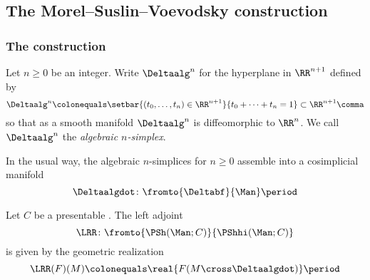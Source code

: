 
\subsection{The Morel--Suslin--Voevodsky construction}\label{sec:MVSconstruction}


\subsubsection{The construction}

\begin{notation}
	Let $ n \geq 0 $ be an integer.
	Write $ \Deltaalg^n $ for the hyperplane in $ \RR^{n+1} $ defined by
	\begin{equation*}
		\Deltaalg^n \colonequals \setbar{(t_0,\ldots,t_{n}) \in \RR^{n+1}}{t_0 + \cdots + t_{n} = 1} \subset \RR^{n+1} \comma
	\end{equation*}
	so that as a smooth manifold $ \Deltaalg^n $ is diffeomorphic to $ \RR^{n} $.
	We call $ \Deltaalg^n $ the \textit{algebraic $ n $-simplex}.

	In the usual way, the algebraic $ n $-simplices for $ n \geq 0 $ assemble into a cosimplicial manifold
	\begin{equation*}
		\Deltaalgdot \colon \fromto{\Deltabf}{\Man} \period
	\end{equation*}
\end{notation}

\begin{proposition}\label{prop:MorelVoevodsky}
	Let $ C $ be a presentable \category. 
	The left adjoint
	\begin{equation*}
		\LRR \colon \fromto{\PSh(\Man;C)}{\PShhi(\Man;C)}
	\end{equation*}
	is given by the geometric realization
	\begin{equation*}
		\LRR(F)(M) \colonequals \real{F(M \cross \Deltaalgdot)} \period
	\end{equation*}
\end{proposition}

